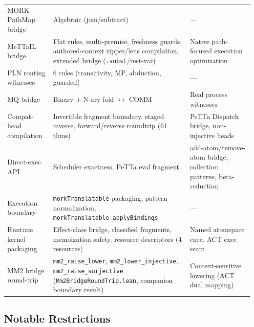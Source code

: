 \documentclass[11pt]{article}
\theoremstyle{definition}
\theoremstyle{remark}
\newcommand{\MORK}{\textup{MORK}}
\newcommand{\MeTTaIL}{\textup{MeTTaIL}}
\newcommand{\PathMap}{\textup{PathMap}}
\begin{document}
\begin{table}[ht!]
\begin{tabular}{@{}lp{5cm}p{4cm}@{}}
\MORK{}--\PathMap{} bridge     & Algebraic (join/subtract) & --- \\
\MeTTaIL{} bridge              & Flat rules, multi-premise, freshness guards, authored-context zipper/lens compilation, extended bridge (\texttt{.subst}/rest-var) & Native path-focused execution optimization \\
PLN routing witnesses          & 6 rules (transitivity, MP, abduction, guarded) & --- \\
MQ bridge                      & Binary + N-ary fold $\leftrightarrow$ COMM & Real process witnesses \\
Compat-head compilation        & Invertible fragment boundary, staged inverse, forward/reverse roundtrip (61 thms) & PeTTa Dispatch bridge, non-injective heads \\
Direct-exec API            & Scheduler exactness, PeTTa eval fragment & add-atom/remove-atom bridge, collection patterns, beta-reduction \\
Execution boundary             & \texttt{morkTranslatable} packaging, pattern normalization, \texttt{morkTranslatable\_applyBindings} & --- \\
Runtime kernel packaging       & Effect-class bridge, classified fragments, memoization safety, resource descriptors (4 resources) & Named atomspace exec, ACT exec seam \\
MM2 bridge round-trip          & \texttt{mm2\_raise\_lower}, \texttt{mm2\_lower\_injective}, \texttt{mm2\_raise\_surjective} (\texttt{Mm2BridgeRoundTrip.lean}, companion boundary result) & Context-sensitive lowering (ACT dual mapping) \\
\bottomrule
\end{tabular}
\end{table}

\subsection{Notable Restrictions}
\end{document}
